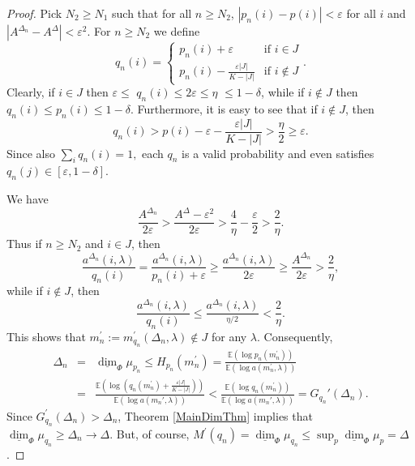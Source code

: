 \documentclass{amsart}
\theoremstyle{plain}
\numberwithin{equation}{section}
\newcommand{\ee}{{\mathbb E}}
\newcommand{\udim}{\underline{\dim}}
\begin{document}
\begin{proof}
Pick $N_{2}\geq N_{1}$ such that for all $n\geq N_{2}$, 
$\left\vert p_{n}(i)-p(i)\right\vert <\varepsilon$ for all $i$ and 
$\left\vert A^{\Delta _{n}}-A^{\Delta }\right\vert <\varepsilon^2$. 
For $n\geq N_{2}$ we define 
\begin{equation*}
   q_{n}(i)=\left\{ \begin{array}{cc}
      p_{n}(i)+\varepsilon  & \text{if }i\in J \\ 
      p_{n}(i)-\frac{\varepsilon \left\vert J\right\vert }{K-\left\vert J\right\vert } & \text{if }i\notin J%
\end{array}%
\right. .
\end{equation*}
Clearly, if $i\in J$ then $\varepsilon \leq $ $q_{n}(i)\leq 2\varepsilon \leq \eta $ $\leq 1-\delta $, 
while if $i\notin J$ then $q_{n}(i)\leq p_{n}(i)\leq 1-\delta$.   
Furthermore, it is easy to see that if $i\notin J$, then  
\begin{equation*}
    q_{n}(i)>p(i)-\varepsilon -\frac{\varepsilon \left\vert J\right\vert }{K-\left\vert J\right\vert }
          >\frac{\eta }{2}\geq \varepsilon.
\end{equation*}
Since also $\sum_{i}q_{n}(i)=1,$ each  $q_{n}$ is a valid probability and
even satisfies  $q_{n}(j)\in [\varepsilon ,1-\delta ]$. 

We have 
\begin{equation*}
    \frac{A^{\Delta _{n}}}{2\varepsilon }>\frac{A^{\Delta }-\varepsilon ^{2}}{2\varepsilon }>
      \frac{4}{\eta }-\frac{\varepsilon }{2}>\frac{2}{\eta }.
\end{equation*}
Thus if $n\geq N_{2}$ and $i\in J$, then
\begin{equation*}
    \frac{a^{\Delta _{n}}(i,\lambda )}{q_{n}(i)}=
        \frac{a^{\Delta _{n}}(i,\lambda)}{p_{n}(i)+\varepsilon }
      \geq \frac{a^{\Delta _{n}}(i,\lambda )}{2\varepsilon }
         \geq \frac{A^{\Delta _{n}}}{2\varepsilon }>\frac{2}{\eta },
\end{equation*}
while if $i\notin J$, then 
\begin{equation*}
    \frac{a^{\Delta _{n}}(i,\lambda )}{q_{n}(i)}\leq 
        \frac{a^{\Delta_{n}}(i,\lambda )}{^{\eta /2}} < \frac{2}{\eta }.
\end{equation*}
This shows that $m_{n}^{\prime } := m_{q_{n}}^{\prime }(\Delta_{n},\lambda )\notin J$ 
for any $\lambda$. Consequently, 
\begin{eqnarray*}
     \Delta _{n} &=&\underline{\dim }_{\Phi }\mu _{p_{n}}\leq
     H_{p_{n}}(m_{n}^{\prime })=
     \frac{\ee(\log p_{n}(m_{n}^{\prime }))}{\ee(\log a(m_{n}^{\prime },\lambda ))}\\
    &=&\frac{\ee( \log\left( q_{n}(m_{n}^{\prime })+\frac{\varepsilon |J|}{K- |J| }\right))}
           {\ee(\log a(m_{n}',\lambda ))}
        <\frac{\ee(\log q_{n}(m_{n}^{\prime }))}{\ee(\log a(m_n',\lambda ))}
                =G_{q_n}'(\Delta_n).
\end{eqnarray*}
Since $G_{q_{n}}^{\prime }(\Delta _{n})>\Delta _{n}$, Theorem \ref{MainDimThm}
implies that  $\underline{\dim }_{\Phi }\mu _{q_{n}}\geq \Delta _{n} \to \Delta$. 
But, of course, $M^{\prime }(q_{n})= \udim_\Phi \mu_{q_n} \leq \sup_{p} \udim_\Phi \mu_p=\Delta$.


\end{proof}
\end{document}
